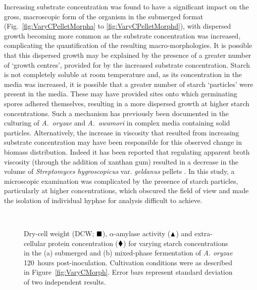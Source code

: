 Increasing substrate concentration was found to have a significant impact on the gross, macroscopic form of the organism in the submerged format (Fig.~\ref{fig:VaryCPelletMorpha} to \ref{fig:VaryCPelletMorphd}), with dispersed growth becoming more common as the substrate concentration was increased, complicating the quantification of the resulting macro-morphologies. It is possible that this dispersed growth may be explained by the presence of a greater number of \lq growth centres', provided for by the increased substrate concentration. Starch is not completely soluble at room temperature and, as its concentration in the media was increased, it is possible that a greater number of starch \lq particles' were present in the media. These may have provided sites onto which germinating spores adhered themselves, resulting in a more dispersed growth at higher starch concentrations. Such a mechanism has previously been documented in the culturing of \emph{A.~oryzae} \cite{truong2004} and \emph{A.~awamori} \cite{cui1998a} in complex media containing solid particles. Alternatively, the increase in viscosity that resulted from increasing substrate concentration may have been responsible for this observed change in biomass distribution. Indeed it has been reported that regulating apparent broth viscosity (through the addition of xanthan gum) resulted in a decrease in the volume of \emph{Streptomyces hygroscopicus} var. \emph{geldanus} pellets \cite{ocleirigh2005}. In this study, a microscopic examination was complicated by the presence of starch particles, particularly at higher concentrations, which obscured the field of view and made the isolation of individual hyphae for analysis difficult to achieve.

\begin{figure}[htbp]
	\centering
	\captionsetup[subfloat]{position=top}
	\\
  \caption{Dry-cell weight (DCW; $\blacksquare$), $\alpha$-amylase activity ($\blacktriangle$) and extra-cellular protein concentration ($\blacklozenge$) for varying starch concentrations in the (a) submerged and (b) mixed-phase fermentation of \emph{A. oryzae} 120~hours post-inoculation. Cultivation conditions were as described in Figure~\ref{fig:VaryCMorph}. Error bars represent standard deviation of two independent results.}
  \label{fig:VaryC}
\end{figure}

